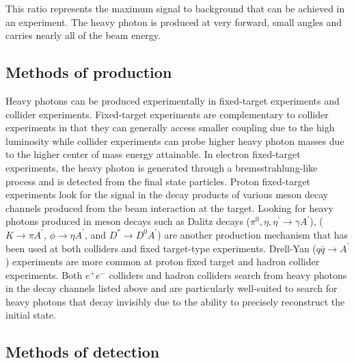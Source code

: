 This ratio represents the maximum signal to background that can be achieved in an experiment. The heavy photon is produced at very forward, small angles and carries nearly all of the beam energy. \\

\subsection{Methods of production}
Heavy photons can be produced experimentally in fixed-target experiments and collider experiments. Fixed-target experiments are complementary to collider experiments in that they can generally access smaller coupling due to the high luminosity while collider experiments can probe higher heavy photon masses due to the higher center of mass energy attainable. In electron fixed-target experiments, the heavy photon is generated through a bremsstrahlung-like process and is detected from the final state particles. Proton fixed-target experiments look for the signal in the decay products of various meson decay channels produced from the beam interaction at the target. Looking for heavy photons produced in meson decays such as Dalitz decays ($\pi^0, \eta, \eta^{\prime}\rightarrow \gamma A^{\prime}$), ($K\rightarrow\pi A^{\prime} $, $\phi\rightarrow\eta A^{\prime}$, and $D^{\ast}\rightarrow D^{0}A^{\prime}$) are another production mechanism that has been used at both colliders and fixed target-type experiments. Drell-Yan ($q\bar{q}\rightarrow A^{\prime}$) experiments are more common at proton fixed target and hadron collider experiments. Both $e^+e^-$ colliders and hadron colliders search from heavy photons in the decay channels listed above and are particularly well-suited to search for heavy photons that decay invisibly due to the ability to precisely reconstruct the initial state. 

\subsection{Methods of detection}

